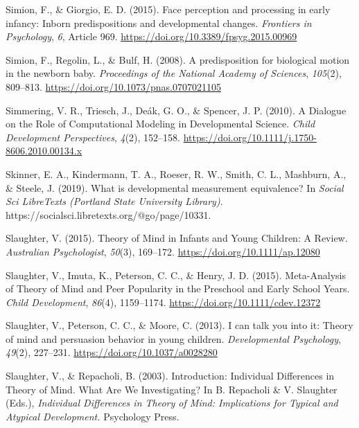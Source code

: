 \documentclass[
]{scrbook}
\newlength{\cslhangindent}
\newenvironment{CSLReferences}[2] %
 {\begin{list}{}{%
  \setlength{\itemindent}{0pt}
  \setlength{\leftmargin}{0pt}
  \setlength{\parsep}{0pt}
  \ifodd #1
   \setlength{\leftmargin}{\cslhangindent}
   \setlength{\itemindent}{-1\cslhangindent}
  \fi
  \setlength{\itemsep}{#2\baselineskip}}}
 {\end{list}}
\begin{document}
\begin{CSLReferences}{1}{0}
Simion, F., \& Giorgio, E. D. (2015). Face perception and processing in early infancy: Inborn predispositions and developmental changes. \emph{Frontiers in Psychology}, \emph{6}, Article 969. \url{https://doi.org/10.3389/fpsyg.2015.00969}

Simion, F., Regolin, L., \& Bulf, H. (2008). A predisposition for biological motion in the newborn baby. \emph{Proceedings of the National Academy of Sciences}, \emph{105}(2), 809--813. \url{https://doi.org/10.1073/pnas.0707021105}

Simmering, V. R., Triesch, J., Deák, G. O., \& Spencer, J. P. (2010). A {Dialogue} on the {Role} of {Computational Modeling} in {Developmental Science}. \emph{Child Development Perspectives}, \emph{4}(2), 152--158. \url{https://doi.org/10.1111/j.1750-8606.2010.00134.x}

Skinner, E. A., Kindermann, T. A., Roeser, R. W., Smith, C. L., Mashburn, A., \& Steele, J. (2019). What is developmental measurement equivalence? In \emph{Social Sci LibreTexts (Portland State University Library)}. https://socialsci.libretexts.org/@go/page/10331.

Slaughter, V. (2015). Theory of {Mind} in {Infants} and {Young Children}: {A Review}. \emph{Australian Psychologist}, \emph{50}(3), 169--172. \url{https://doi.org/10.1111/ap.12080}

Slaughter, V., Imuta, K., Peterson, C. C., \& Henry, J. D. (2015). Meta-{Analysis} of {Theory} of {Mind} and {Peer Popularity} in the {Preschool} and {Early School Years}. \emph{Child Development}, \emph{86}(4), 1159--1174. \url{https://doi.org/10.1111/cdev.12372}

Slaughter, V., Peterson, C. C., \& Moore, C. (2013). I can talk you into it: {Theory} of mind and persuasion behavior in young children. \emph{Developmental Psychology}, \emph{49}(2), 227--231. \url{https://doi.org/10.1037/a0028280}

Slaughter, V., \& Repacholi, B. (2003). Introduction: {Individual Differences} in {Theory} of {Mind}. {What Are We Investigating}? In B. Repacholi \& V. Slaughter (Eds.), \emph{Individual {Differences} in {Theory} of {Mind}: {Implications} for {Typical} and {Atypical Development}.} Psychology Press.


\end{CSLReferences}
\end{document}
